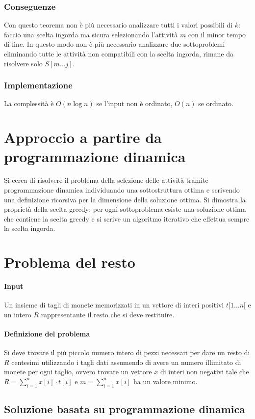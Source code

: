 \subsubsection{Conseguenze}
Con questo teorema non \`e pi\`u necessario analizzare tutti i valori possibili di $k$: faccio una scelta ingorda ma sicura selezionando l'attivit\`a $m$ con il minor tempo di fine.
In questo modo non \`e pi\`u necessario analizzare due sottoproblemi eliminando tutte le attivit\`a non compatibili con la scelta ingorda, rimane da risolvere solo $S[m\dots j]$. 
\subsubsection{Implementazione}

La complessit\`a \`e $O(n\log n)$ se l'input non \`e ordinato, $O(n)$ se ordinato. 
\section{Approccio a partire da programmazione dinamica}
Si cerca di risolvere il problema della selezione delle attivit\`a tramite programmazione dinamica individuando una sottostruttura ottima e scrivendo una definizione ricorsiva per la
dimensione della soluzione ottima. Si dimostra la propriet\`a della scelta greedy: per ogni sottoproblema esiste una soluzione ottima che contiene la scelta greedy e si scrive un
algoritmo iterativo che effettua sempre la scelta ingorda.
\section{Problema del resto}
\paragraph{Input}
Un insieme di tagli di monete memorizzati in un vettore di interi positivi $t[1\dots n[$ e un intero $R$ rappresentante il resto che si deve restituire.
\paragraph{Definizione del problema}
Si deve trovare il pi\`u piccolo numero intero di pezzi necessari per dare un resto di $R$ centesimi utilizzando i tagli dati assumendo di avere un numero illimitato di monete per ogni 
taglio, ovvero trovare un vettore $x$ di interi non negativi tale che $R=\sum\limits_{i = 1}^nx[i]\cdot t[i]$ e $m=\sum\limits_{i = 1}^nx[i]$ ha un valore minimo.
\subsection{Soluzione basata su programmazione dinamica}
